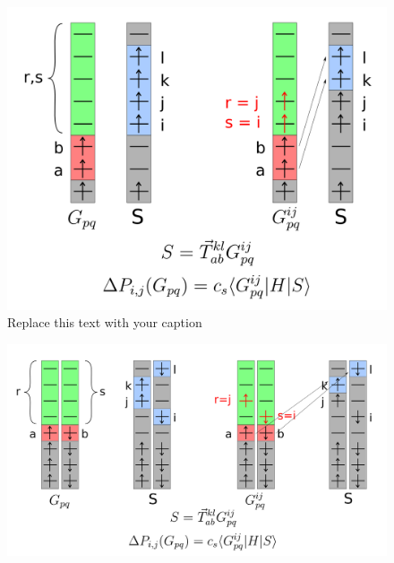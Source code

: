 \documentclass[./thesis.tex]{subfiles}
\begin{document}
\begin{figure}[h!]
	\begin{center}
		\includegraphics[width=0.70\columnwidth]{figures/cipsi/systematic_determination}
		\caption{{Replace this text with your caption%
		}}
	\end{center}
\end{figure}
\begin{figure}[h!]
	\begin{center}
		\includegraphics[width=0.70\columnwidth]{figures/cipsi/systematic_determination2}
		\caption{{\label{splash}%
		}}
	\end{center}
\end{figure}
\end{document}
